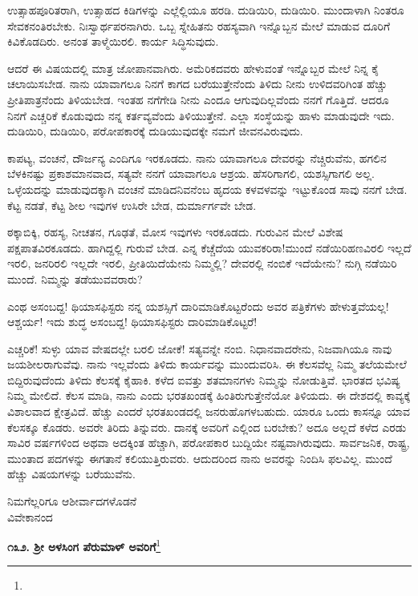 ಉತ್ಸಾಹಪೂರಿತರಾಗಿ, ಉತ್ಸಾಹದ ಕಿಡಿಗಳನ್ನು ಎಲ್ಲೆಲ್ಲಿಯೂ ಹರಡಿ. ದುಡಿಯಿರಿ, ದುಡಿಯಿರಿ. ಮುಂದಾಳಾಗಿ ನಿಂತರೂ ಸೇವಕನಂತಿರಬೇಕು. ನಿಃಸ್ವಾರ್ಥಪರನಾಗಿರು. ಒಬ್ಬ ಸ್ನೇಹಿತನು ರಹಸ್ಯವಾಗಿ ಇನ್ನೊಬ್ಬನ ಮೇಲೆ ಮಾಡುವ ದೂರಿಗೆ ಕಿವಿಕೊಡದಿರು. ಅನಂತ ತಾಳ್ಮೆಯಿರಲಿ. ಕಾರ್ಯ ಸಿದ್ಧಿಸುವುದು.

ಆದರೆ ಈ ವಿಷಯದಲ್ಲಿ ಮಾತ್ರ ಜೋಪಾನವಾಗಿರು. ಅಮೆರಿಕದವರು ಹೇಳುವಂತೆ ಇನ್ನೊಬ್ಬರ ಮೇಲೆ ನಿನ್ನ ಕೈ ಚಲಾಯಿಸಬೇಡ. ನಾನು ಯಾವಾಗಲೂ ನಿನಗೆ ಕಾಗದ ಬರೆಯುತ್ತೇನೆಂದು ತಿಳಿದು ನೀನು ಉಳಿದವರಿಗಿಂತ ಹೆಚ್ಚು ಪ್ರೀತಿಪಾತ್ರನೆಂದು ತಿಳಿಯಬೇಡ. ಇಂತಹ ನಗೆಗೇಡಿ ನೀನು ಎಂದೂ ಆಗುವುದಿಲ್ಲವೆಂದು ನನಗೆ ಗೊತ್ತಿದೆ. ಆದರೂ ನಿನಗೆ ಎಚ್ಚರಿಕೆ ಕೊಡುವುದು ನನ್ನ ಕರ್ತವ್ಯವೆಂದು ತಿಳಿಯುತ್ತೇನೆ. ಎಲ್ಲಾ ಸಂಸ್ಥೆಯನ್ನು ಹಾಳು ಮಾಡುವುದೇ ಇದು. ದುಡಿಯಿರಿ, ದುಡಿಯಿರಿ, ಪರೋಪಕಾರಕ್ಕೆ ದುಡಿಯುವುದಕ್ಕೇ ನಮಗೆ ಜೀವನವಿರುವುದು.

ಕಾಪಟ್ಯ, ವಂಚನೆ, ದೌರ್ಜನ್ಯ ಎಂದಿಗೂ ಇರಕೂಡದು. ನಾನು ಯಾವಾಗಲೂ ದೇವರನ್ನು ನೆಚ್ಚಿರುವೆನು, ಹಗಲಿನ ಬೆಳಕಿನಷ್ಟು ಪ್ರಕಾಶಮಾನವಾದ, ಸತ್ಯವೇ ನನಗೆ ಯಾವಾಗಲೂ ಆಶ್ರಯ. ಹೆಸರಿಗಾಗಲಿ, ಯಶಸ್ಸಿಗಾಗಲಿ ಅಲ್ಲ. ಒಳ್ಳೆಯದನ್ನು ಮಾಡುವುದಕ್ಕಾಗಿ ವಂಚನೆ ಮಾಡಿದನಿವನೆಂಬ ಹೃದಯ ಕಳವಳವನ್ನು ಇಟ್ಟುಕೊಂಡ ಸಾವು ನನಗೆ ಬೇಡ. ಕೆಟ್ಟ ನಡತೆ, ಕೆಟ್ಟ ಶೀಲ ಇವುಗಳ ಉಸಿರೇ ಬೇಡ, ದುರ್ಮಾರ್ಗವೇ ಬೇಡ.

ಠಕ್ಕಾಬಿಕ್ಕಿ, ರಹಸ್ಯ, ನೀಚತನ, ಗೂಢತೆ, ಮೋಸ ಇವುಗಳು ಇರಕೂಡದು. ಗುರುವಿನ ಮೇಲೆ ವಿಶೇಷ ಪಕ್ಷಪಾತವಿರಕೂಡದು. ಹಾಗಿದ್ದಲ್ಲಿ ಗುರುವೆ ಬೇಡ. ಎನ್ನ ಕೆಚ್ಚೆದೆಯ ಯುವಕರಿರಾ!ಮುಂದೆ ನಡೆಯಿರಿ\enginline{-}ಹಣವಿರಲಿ ಇಲ್ಲದೆ ಇರಲಿ, ಜನರಿರಲಿ ಇಲ್ಲದೇ ಇರಲಿ, ಪ್ರೀತಿಯಿದೆಯೇನು ನಿಮ್ಮಲ್ಲಿ? ದೇವರಲ್ಲಿ ನಂಬಿಕೆ ಇದೆಯೇನು? ನುಗ್ಗಿ ನಡೆಯಿರಿ ಮುಂದೆ. ನಿಮ್ಮನ್ನು ತಡೆಯುವವರಾರು?

ಎಂಥ ಅಸಂಬದ್ದ! ಥಿಯಾಸಫಿಸ್ಟರು ನನ್ನ ಯಶಸ್ಸಿಗೆ ದಾರಿಮಾಡಿಕೊಟ್ಟರೆಂದು ಅವರ ಪತ್ರಿಕೆಗಳು ಹೇಳುತ್ತವೆಯಲ್ಲ! ಆಶ್ಚರ್ಯ! ಇದು ಶುದ್ಧ ಅಸಂಬದ್ದ! ಥಿಯಾಸಫಿಸ್ಟರು ದಾರಿಮಾಡಿಕೊಟ್ಟರೆ!

ಎಚ್ಚರಿಕೆ! ಸುಳ್ಳು ಯಾವ ವೇಷದಲ್ಲೇ ಬರಲಿ ಜೋಕೆ! ಸತ್ಯವನ್ನೇ ನಂಬಿ. ನಿಧಾನವಾದರೇನು, ನಿಜವಾಗಿಯೂ ನಾವು ಜಯಶೀಲರಾಗುವೆವು. ನಾನು ಇಲ್ಲವೆಂದು ತಿಳಿದು ಕಾರ್ಯವನ್ನು ಮುಂದುವರಿಸಿ. ಈ ಕೆಲಸವೆಲ್ಲ ನಿಮ್ಮ ತಲೆಯಮೇಲೆ ಬಿದ್ದಿರುವುದೆಂದು ತಿಳಿದು ಕೆಲಸಕ್ಕೆ ಕೈಹಾಕಿ. ಕಳೆದ ಐವತ್ತು ಶತಮಾನಗಳು ನಿಮ್ಮನ್ನು ನೋಡುತ್ತಿವೆ. ಭಾರತದ ಭವಿಷ್ಯ ನಿಮ್ಮ ಮೇಲಿದೆ. ಕೆಲಸ ಮಾಡಿ, ನಾನು ಎಂದು ಭರತಖಂಡಕ್ಕೆ ಹಿಂತಿರುಗುತ್ತೇನೆಯೋ ತಿಳಿಯದು. ಈ ದೇಶದಲ್ಲಿ ಕಾವ್ಯಕ್ಕೆ ವಿಶಾಲವಾದ ಕ್ಷೇತ್ರವಿದೆ. ಹೆಚ್ಚು ಎಂದರೆ ಭರತಖಂಡದಲ್ಲಿ ಜನರುಹೊಗಳಬಹುದು. ಯಾರೂ ಒಂದು ಕಾಸನ್ನೂ ಯಾವ ಕೆಲಸಕ್ಕೂ ಕೊಡರು. ಅವರೇ ತಿರಿದು ತಿನ್ನುವರು. ದಾನಕ್ಕೆ ಅವರಿಗೆ ಎಲ್ಲಿಂದ ಬರಬೇಕು? ಅದೂ ಅಲ್ಲದೆ ಕಳೆದ ಎರಡು ಸಾವಿರ ವರ್ಷಗಳಿಂದ ಅಥವಾ ಅದಕ್ಕಿಂತ ಹೆಚ್ಚಾಗಿ, ಪರೋಪಕಾರ ಬುದ್ದಿಯೇ ನಷ್ಟವಾಗಿರುವುದು. ಸಾರ್ವಜನಿಕ, ರಾಷ್ಟ್ರ, ಮುಂತಾದ ಪದಗಳನ್ನು ಈಗತಾನೆ ಕಲಿಯುತ್ತಿರುವರು. ಆದುದರಿಂದ ನಾನು ಅವರನ್ನು ನಿಂದಿಸಿ ಫಲವಿಲ್ಲ. ಮುಂದೆ ಹೆಚ್ಚು ವಿಷಯಗಳನ್ನು ಬರೆಯುವೆನು.

{\flushright
ನಿಮಗೆಲ್ಲರಿಗೂ ಆಶೀರ್ವಾದಗಳೊಡನೆ\\ವಿವೇಕಾನಂದ\par}

\begin{center}
\textbf{೧೩೨. ಶ‍್ರೀ ಅಳಸಿಂಗ ಪೆರುಮಾಳ್ ಅವರಿಗೆ}\footnote{}
\end{center}

